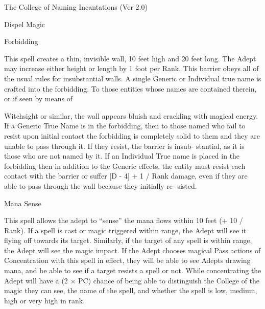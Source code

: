 \begin{Chapter}{The College of Naming Incantations (Ver 2.0)}
\begin{spell}[S-5]{Dispel Magic }
\begin{effects}
\end{effects}
\end{spell}

\begin{spell}[S-6]{Forbidding }

\begin{effects}
This spell creates a thin, invisible wall, 10 
feet high and 20 feet long. The Adept may increase 
either  height  or  length  by  1  foot  per  Rank.  This 
barrier obeys all of the usual rules for insubstantial 
walls.  A  single  Generic  or  Individual  true name  is 
crafted into the forbidding. To those entities whose 
names are contained therein, or if seen by means of 

Witchsight  or  similar,  the  wall  appears  bluish  and 
crackling  with  magical  energy.  If  a  Generic  True 
Name  is  in  the  forbidding,  then  to  those  named 
who fail to resist upon initial contact the forbidding 
is completely solid to them and they  are unable to 
pass through  it.  If  they  resist,  the  barrier  is  insub-
stantial, as it is those who are not named by it. If an 
Individual  True  name  is  placed  in  the  forbidding 
then  in  addition  to  the  Generic  effects,  the  entity 
must  resist  each  contact  with  the  barrier  or  suffer 
[D - 4] + 1 / Rank damage, even if they are able to 
pass  through  the  wall  because  they  initially  re-
sisted. 

\end{effects}
\end{spell}

\begin{spell}[S-7]{Mana Sense }

\begin{effects}
 This  spell  allows  the  adept  to  “sense”  the 
mana flows within 10 feet (+ 10 / Rank). If a spell 
is  cast  or  magic  triggered  within  range,  the  Adept 
will see it flying off towards its target. Similarly, if 
the  target  of  any  spell  is  within  range,  the  Adept 
will  see  the  magic  impact.  If  the  Adept  chooses 
magical  Pass  actions  of  Concentration  with  this 
spell  in  effect,  they  will  be  able  to  see  Adepts 
drawing mana, and be able to see if a target resists 
a  spell  or  not.  While  concentrating  the  Adept  will 
have a (2 × PC) chance of being able to distinguish 
the College of the magic they can see, the name of 
the  spell,  and  whether  the  spell  is  low,  medium, 
high or very high in rank. 


\end{effects}
\end{spell}
\end{Chapter}

